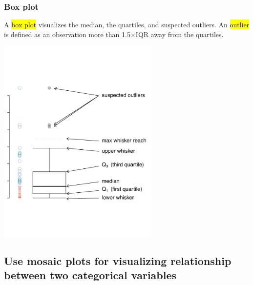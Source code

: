 \documentclass[slidestop,compress,mathserif,12pt,t,professionalfonts,xcolor=table]{beamer}
\begin{document}
\begin{frame}
\frametitle{Box plot}

A \hl{box plot} visualizes the median, the quartiles, and suspected outliers. An \hl{outlier} is defined as an observation more than 1.5$\times$IQR away from the quartiles.

\begin{center}
\includegraphics[width=0.6\textwidth]{figures/boxPlotLayoutNumVar}
\end{center}

\end{frame}


\begin{frame}[fragile]
\frametitle{}

\vfill


\vfill

\end{frame}


\subsection{Use mosaic plots for visualizing relationship between two categorical variables}
\label{mi5}

\end{document}
